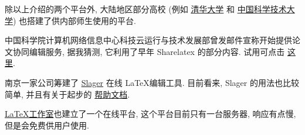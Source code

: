 除以上介绍的两个平台外,
大陆地区部分高校 (例如%
\href{https://overleaf.tsinghua.edu.cn/login}{清华大学}%
和%
\href{https://latex.ustc.edu.cn/login}{中国科学技术大学}) 也搭建了供内部师生使用的平台.

中国科学院计算机网络信息中心科技云运行与技术发展部曾发邮件宣称开始提供论文协同编辑服务,
据我猜测,
它利用了早年 Sharelatex 的部分内容.
试用可点击%
\href{https://www.cstcloud.cn/resources/452}{这里}.

南京一家公司筹建了
\href{https://www.slager.link/#/Home}{Slager} 在线 \LaTeX 编辑工具.
目前看来,
Slager 的用法也比较简单,
并且有关于起步的%
\href{https://www.slager.link/#/HelpCenter}{帮助文档}.

\href{https://online.latexstudio.net}{\LaTeX 工作室}也建立了一个在线平台,
这个平台目前只有一台服务器,
响应有点慢,
但是会免费供用户使用.
